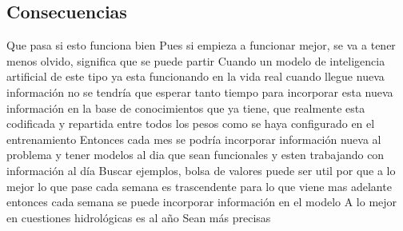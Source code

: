 \subsection{Consecuencias}

    Que pasa si esto funciona bien 
    Pues si empieza a funcionar mejor, se va a tener menos olvido, significa que se puede partir
    Cuando un modelo de inteligencia artificial de este tipo ya esta funcionando en la vida real cuando llegue nueva información no se tendría que esperar tanto tiempo para incorporar esta nueva información en la base de conocimientos que ya tiene, que realmente esta codificada y repartida entre todos los pesos como se haya configurado en el entrenamiento
    Entonces  cada mes se podría incorporar información nueva al problema y tener modelos al dia que sean funcionales y esten trabajando con información al día 
    Buscar ejemplos,  bolsa de valores puede ser util por que a lo mejor lo que pase cada semana es trascendente para lo que viene mas adelante entonces cada semana se puede incorporar información en el modelo
    A lo mejor en cuestiones hidrológicas es al año
    Sean más precisas
